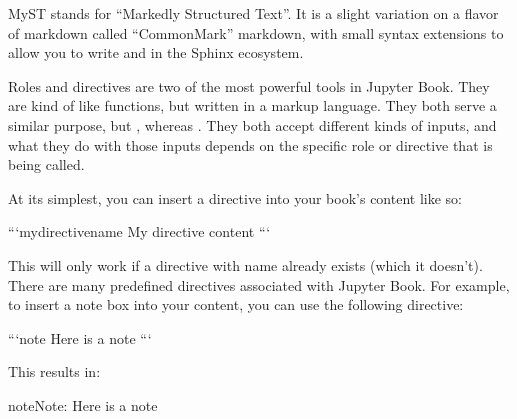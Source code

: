 \documentclass[letterpaper,10pt,english]{jupyterBook}
\begin{document}
\sphinxAtStartPar
MyST stands for “Markedly Structured Text”. It
is a slight variation on a flavor of markdown called “CommonMark” markdown,
with small syntax extensions to allow you to write  and 
in the Sphinx ecosystem.

\begin{DUlineblock}{0em}
\item[] 
\end{DUlineblock}

\sphinxAtStartPar
Roles and directives are two of the most powerful tools in Jupyter Book. They
are kind of like functions, but written in a markup language. They both
serve a similar purpose, but , whereas
. They both accept different kinds of inputs,
and what they do with those inputs depends on the specific role or directive
that is being called.

\begin{DUlineblock}{0em}
\item[] 
\end{DUlineblock}

\sphinxAtStartPar
At its simplest, you can insert a directive into your book’s content like so:

\begin{sphinxVerbatim}[commandchars=\\\{\}]
```\PYGZob{}mydirectivename\PYGZcb{}
My directive content
```
\end{sphinxVerbatim}

\sphinxAtStartPar
This will only work if a directive with name  already exists
(which it doesn’t). There are many pre\sphinxhyphen{}defined directives associated with
Jupyter Book. For example, to insert a note box into your content, you can
use the following directive:

\begin{sphinxVerbatim}[commandchars=\\\{\}]
```\PYGZob{}note\PYGZcb{}
Here is a note
```
\end{sphinxVerbatim}

\sphinxAtStartPar
This results in:

\begin{sphinxadmonition}{note}{Note:}
\sphinxAtStartPar
Here is a note
\end{sphinxadmonition}
\end{document}

